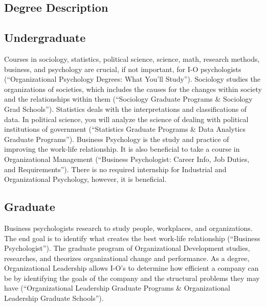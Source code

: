 \begin{multicols}{2}

\section{Degree Description}
    \subsection{Undergraduate}
        Courses in sociology, statistics, political science, science, math, research methods, business, and psychology are crucial, if not important, for I-O psychologists (“Organizational Psychology Degrees: What You’ll Study”). Sociology studies the organizations of societies, which includes the causes for the changes within society and the relationships within them (“Sociology Graduate Programs \& Sociology Grad Schools”). Statistics deals with the interpretations and classifications of data. In political science, you will analyze the science of dealing with political institutions of government (“Statistics Graduate Programs \& Data Analytics Graduate Programs”). Business Psychology is the study and practice of improving the work-life relationship. It is also beneficial to take a course in Organizational Management (“Business Psychologist: Career Info, Job Duties, and Requirements”). There is no required internship for Industrial and Organizational Psychology, however, it is beneficial. 
    \subsection{Graduate}
        Business psychologists research to study people, workplaces, and organizations. The end goal is to identify what creates the best work-life relationship (“Business Psychologist”). The graduate program of Organizational Development studies, researches, and theorizes organizational change and performance. As a degree, Organizational Leadership allows I-O’s to determine how efficient a company can be by identifying the goals of the company and the structural problems they may have (“Organizational Leadership Graduate Programs \& Organizational Leadership Graduate Schools”).


\end{multicols}
